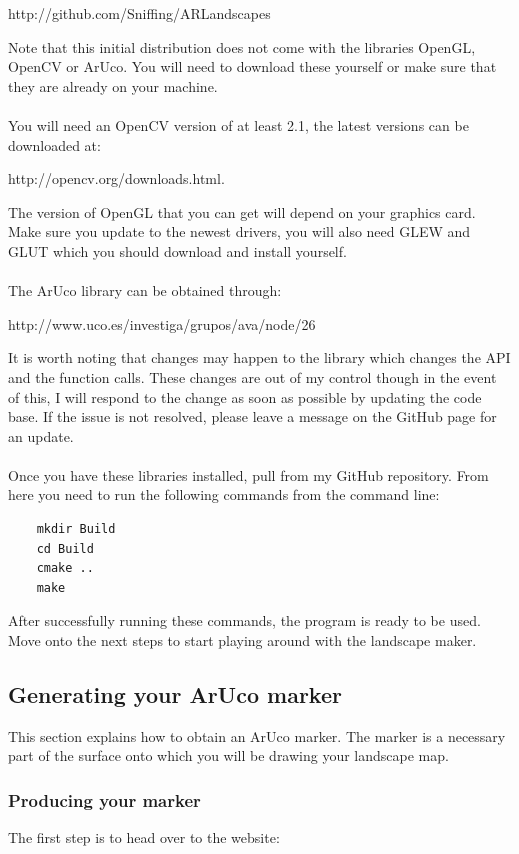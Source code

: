 \documentclass[11pt]{article}
\begin{document}
\begin{center}
http://github.com/Sniffing/ARLandscapes
\end{center}

Note that this initial distribution does not come with the libraries
OpenGL, OpenCV or ArUco. You will need to download these yourself or make 
sure that they are already on your machine.\\
\\
You will need an OpenCV version of at least 2.1, the latest versions can
be downloaded at:
	\begin{center}
		http://opencv.org/downloads.html.
	\end{center} 
The version of OpenGL that you can get will depend on your graphics card.
Make sure you update to the newest drivers, you will also need GLEW and GLUT
which you should download and install yourself.\\
\\
The ArUco library can be obtained through:
	\begin{center}
		http://www.uco.es/investiga/grupos/ava/node/26	
	\end{center}
It is worth noting that changes may happen to the library which changes the
API and the function calls. These changes are out of my control though
in the event of this, I will respond to the change as soon as 
possible by updating the code base. If the issue is not resolved,
please leave a message on the GitHub page for an update.\\
\\
Once you have these libraries installed, pull from my GitHub 
repository. From here you need to run the following commands from the
command line:

\begin{verbatim}
	mkdir Build
	cd Build
	cmake ..
	make
\end{verbatim}

After successfully running these commands, the program is ready to be used.
Move onto the next steps to start playing around with the landscape maker.

\newpage
\subsection{Generating your ArUco marker}
This section explains how to obtain an ArUco marker. The marker is 
a necessary part of the surface onto which you will be drawing your 
landscape map. 

\subsubsection*{Producing your marker}
The first step is to head over to the website:
\end{document}
